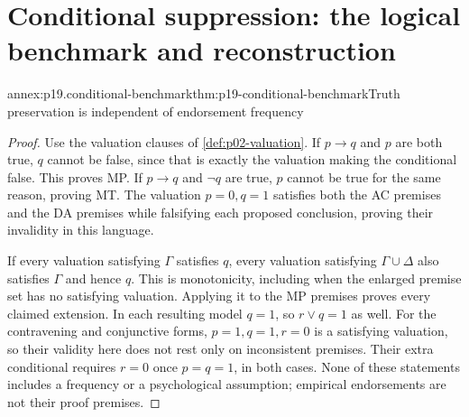 \section{Conditional suppression: the logical benchmark and reconstruction}
\label{sec:annex-p19-conditional-suppression}

\begin{annexitem}{annex:p19.conditional-benchmark}{thm:p19-conditional-benchmark}{Truth preservation is independent of endorsement frequency}
\begin{proof}
Use the valuation clauses of \cref{def:p02-valuation}. If \(p\to q\)
and \(p\) are both true, \(q\) cannot be false, since that is exactly
the valuation making the conditional false. This proves MP. If
\(p\to q\) and \(\neg q\) are true, \(p\) cannot be true for the
same reason, proving MT. The valuation \(p=0,q=1\) satisfies both
the AC premises and the DA premises while falsifying each proposed
conclusion, proving their invalidity in this language.

If every valuation satisfying \(\Gamma\) satisfies \(q\), every
valuation satisfying \(\Gamma\cup\Delta\) also satisfies \(\Gamma\)
and hence \(q\). This is monotonicity, including when the enlarged
premise set has no satisfying valuation. Applying it to the MP premises
proves every claimed extension. In each resulting model \(q=1\), so
\(r\lor q=1\) as well. For the contravening and conjunctive forms,
\(p=1,q=1,r=0\) is a satisfying valuation, so their validity here
does not rest only on inconsistent premises. Their extra conditional
requires \(r=0\) once \(p=q=1\), in both cases.
None of these statements includes a frequency or a psychological
assumption; empirical endorsements are not their proof premises.
\end{proof}
\end{annexitem}

